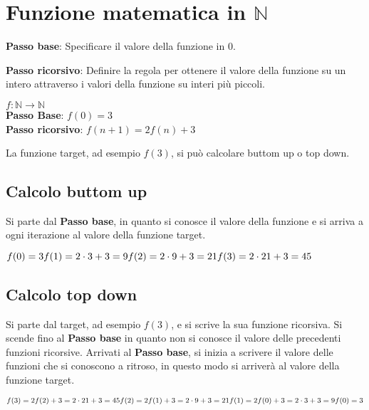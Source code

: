 \section{Funzione matematica in $\mathbb{N}$}
\textbf{Passo base}: Specificare il valore della funzione in $0$.

\textbf{Passo ricorsivo}: Definire la regola per ottenere il valore della funzione su un intero attraverso i valori della funzione su interi più piccoli.

\begin{example}
$f: \mathbb{N} \longrightarrow \mathbb{N}$ \\
\textbf{Passo Base}: $f(0) = 3$ \\
\textbf{Passo ricorsivo}: $f(n + 1) = 2f(n) + 3$
\end{example}

La funzione target, ad esempio $f(3)$, si può calcolare buttom up o top down.

\subsection{Calcolo buttom up}
Si parte dal \textbf{Passo base}, in quanto si conosce il valore della funzione e si arriva a ogni iterazione al valore della funzione target.
\begin{example}
$f(0) = 3 \\
f(1) = 2 \cdot 3 + 3 = 9 \\
f(2) = 2 \cdot 9 + 3 = 21 \\
f(3) = 2 \cdot 21 + 3 = 45$
\end{example}

\subsection{Calcolo top down}
Si parte dal target, ad esempio $f(3)$, e si scrive la sua funzione ricorsiva. Si scende fino al \textbf{Passo base} in quanto non si conosce il valore delle precedenti funzioni ricorsive. Arrivati al \textbf{Passo base}, si inizia a scrivere il valore delle funzioni che si conoscono a ritroso, in questo modo si arriverà al valore della funzione target.
\begin{example}
$f(3) = 2f(2) + 3 = 2 \cdot 21 + 3 = 45 \\
f(2) = 2f(1) + 3 = 2 \cdot 9 + 3 = 21 \\
f(1) = 2f(0) + 3 = 2 \cdot 3 + 3 = 9 \\
f(0) = 3$
\end{example}

